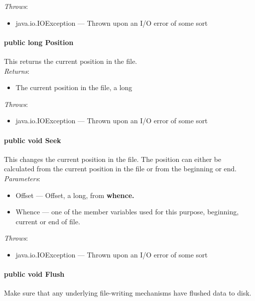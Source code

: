 \documentclass[$Date: 2003/06/26 19:29:31 $]{glabarticle}
\begin{document}
\textit{Throws}:
\begin{itemize}
\item[]  java.io.IOException --- Thrown upon an I/O error of some sort
\end{itemize}

\paragraph{public long Position}

This returns the current position in the file.\\

\textit{Returns}:
\begin{itemize}
\item[] The current position in the file, a long
\end{itemize}

\textit{Throws}:
\begin{itemize}
\item[]  java.io.IOException --- Thrown upon an I/O error of some sort
\end{itemize}

\paragraph{public void Seek}

This changes the current position in the file.  The position can
either be calculated from the current position in the file or from the
beginning or end.\\

\textit{Parameters}:
\begin{itemize}
\item[] Offset --- Offset, a long,  from \bf{whence}.
\item[] Whence --- one of the member variables used for this purpose, beginning, current or end of file.
\end{itemize}

\textit{Throws}:
\begin{itemize}
\item[]  java.io.IOException --- Thrown upon an I/O error of some sort
\end{itemize}

\paragraph{public void Flush}

Make sure that any underlying file-writing mechanisms have flushed
data to disk.
\end{document}
